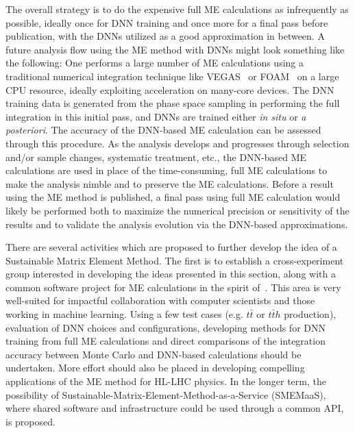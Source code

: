 The overall strategy is to do the expensive full ME calculations as infrequently as possible, ideally once for DNN training and once more for a final pass before publication, with the DNNs utilized as a good approximation in between. A future analysis flow using the ME method with DNNs might look something like the following: One performs a large number of ME calculations using a traditional numerical integration technique like {\sf VEGAS}~\cite{PETERLEPAGE1978192,Ohl:1998jn} or {\sf FOAM}~\cite{JADACH200355} on a large CPU resource, ideally exploiting acceleration on many-core devices. The DNN training data is generated from the phase space sampling in performing the full integration in this initial pass, and DNNs are trained either \emph{in situ} or \emph{a posteriori}. The accuracy of the DNN-based ME calculation can be assessed through this procedure. As the analysis develops and progresses through selection and/or sample changes, systematic treatment, etc., the DNN-based ME calculations are used in place of the time-consuming, full ME calculations to make the analysis nimble and to preserve the ME calculations. Before a result using the ME method is published, a final pass using full ME calculation would likely be performed both to maximize the numerical precision or sensitivity of the results and to validate the analysis evolution via the DNN-based approximations.

There are several activities which are proposed to further develop the idea of a Sustainable Matrix Element Method. The first is to establish a cross-experiment group interested in developing the ideas presented in this section, along with a common software project for ME calculations in the spirit of~\cite{MoMEMta}. This area is very well-suited for impactful collaboration with computer scientists and those working in machine learning. Using a few test cases (e.g. $t\bar{t}$ or $t\bar{t}h$ production), evaluation of DNN choices and configurations, developing methods for DNN training from full ME calculations and direct comparisons of the integration accuracy between Monte Carlo and DNN-based calculations should be undertaken. More effort should also be placed in developing compelling applications of the ME method for HL-LHC physics. In the longer term, the possibility of Sustainable-Matrix-Element-Method-as-a-Service (SMEMaaS), where shared software and infrastructure could be used through a common API, is proposed.

